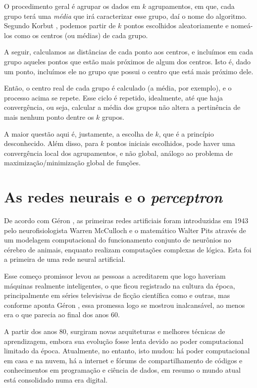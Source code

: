 O procedimento geral é agrupar os dados em $k$ agrupamentos, em que, cada grupo terá uma \emph{média} que irá caracterizar esse grupo, daí o nome do algoritmo. Segundo Korbut \citep{korbut}, podemos partir de $k$ pontos escolhidos aleatoriamente e nomeá-los como os centros (ou médias) de cada grupo.

A seguir, calculamos as distâncias de cada ponto aos centros, e incluímos em cada grupo aqueles pontos que estão mais próximos de algum dos centros. Isto é, dado um ponto, incluímos ele no grupo que possui o centro que está mais próximo dele.

Então, o centro real de cada grupo é calculado (a média, por exemplo), e o processo acima se repete. Esse ciclo é repetido, idealmente, até que haja convergência, ou seja, calcular a média dos grupos não altera a pertinência de mais nenhum ponto dentre os $k$ grupos.

A maior questão aqui é, justamente, a escolha de $k$, que é a princípio desconhecido. Além disso, para $k$ pontos iniciais escolhidos, pode haver uma convergência local dos agrupamentos, e não global, análogo ao problema de maximização/minimização global de funções.

\section{As redes neurais e o \emph{perceptron}}

De acordo com Géron \citep{hands}, as primeiras redes artificiais foram introduzidas em 1943 pelo neurofisiologista Warren McCulloch e o matemático Walter Pits através de um modelagem computacional do funcionamento conjunto de neurônios no cérebro de animais, enquanto realizam computações complexas de lógica. Esta foi a primeira  de uma rede neural artificial.

Esse começo promissor levou as pessoas a acreditarem que logo haveriam máquinas realmente inteligentes, o que ficou registrado na cultura da época, principalmente em séries televisivas de ficção científica como  e outras, mas conforme aponta Géron \citep{hands}, essa promessa logo se mostrou inalcansável, ao menos era o que parecia ao final dos anos 60. 

A partir dos anos 80, surgiram novas arquiteturas e melhores técnicas de aprendizagem, embora sua evolução fosse lenta devido ao poder computacional limitado da época. Atualmente, no entanto, isto mudou: há poder computacional em casa e na nuvem, há a internet e fórums de compartilhamento de códigos e conhecimentos em programação e ciência de dados, em resumo o mundo atual está consolidado numa era digital. 


